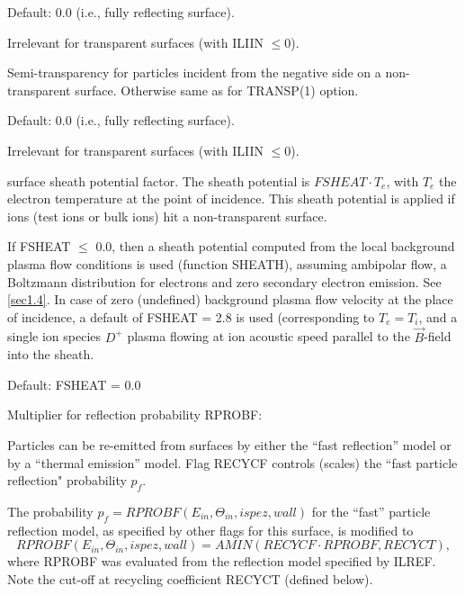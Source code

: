 \begin{description}
        Default: 0.0  (i.e., fully reflecting surface).

        Irrelevant for transparent surfaces (with ILIIN $\leq 0$).

  \item[TRANSP(2)] Semi-transparency for particles incident from the negative
        side on a non-trans\-parent surface.
        Otherwise same as for TRANSP(1) option.

        Default: 0.0  (i.e., fully reflecting surface).

        Irrelevant for transparent surfaces (with ILIIN $\leq 0$).

  \item[FSHEAT] surface sheath potential factor.
        The sheath potential is $FSHEAT \cdot T_e$, with $T_e$ the electron temperature
        at the point of incidence.
        This sheath potential is applied if ions (test ions or bulk ions) hit a
        non-transparent surface.

        If FSHEAT $\le$ 0.0, then a sheath potential computed from the local background
        plasma flow conditions is used (function SHEATH), assuming ambipolar flow, a
        Boltzmann distribution for electrons and zero secondary electron emission.
        See \cref{sec1.4}.
        In case of zero (undefined) background plasma flow velocity at the place of
        incidence, a default of FSHEAT = 2.8 is used (corresponding to $T_e = T_i$, and
        a single ion species $D^+$ plasma flowing at ion acoustic speed parallel to the
        $\vec B$-field into the sheath.

        Default: FSHEAT = 0.0 

  \item[RECYCF, RECYCT] Multiplier for reflection probability RPROBF:

        Particles can be re-emitted from surfaces by either the ``fast reflection''
        model or by a ``thermal emission'' model.
        Flag RECYCF controls (scales) the ``fast particle reflection" probability
        $p_f$.

        The probability $p_f = RPROBF(E_{in},\Theta_{in},ispez,wall)$ for the ``fast''
        particle reflection model, as specified by other flags for this surface, is
        modified to
        \begin{equation}
          \label{rprobf}
          RPROBF(E_{in},\Theta_{in},ispez,wall) = AMIN( RECYCF \cdot RPROBF, RECYCT),
        \end{equation}
        where RPROBF was evaluated from the reflection model specified
        by ILREF.
        Note the cut-off at recycling coefficient RECYCT (defined below).


\end{description}
